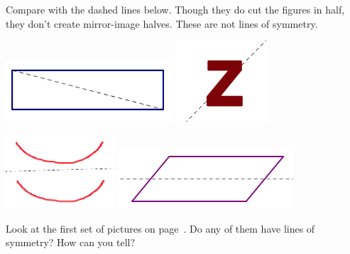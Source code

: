 \bigskip
\noindent
Compare with the dashed lines below.  Though they do cut the figures in half, they don't create mirror-image halves.  These are not lines of symmetry.

\begin{center}
\includegraphics[height=2.25cm]{notlinesym1}
\qquad \qquad
\includegraphics[height=3cm]{notlinesym2}


\includegraphics[height=2.75cm]{notlinesym3}
\qquad \qquad
\includegraphics[height=2.25cm]{notlinesym4}
\end{center}

\bigskip

\begin{thinkpair*}
Look at the first set of pictures on page~\pageref{pics:symm}.  Do any of them have lines of symmetry?  How can you tell?
\end{thinkpair*}

\newpage

